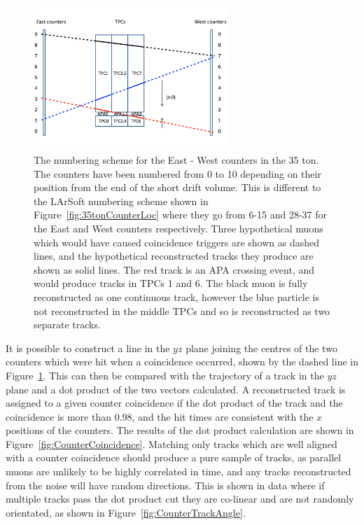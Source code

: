 \begin{figure}[h!]
  \centering
  \includegraphics[width=0.65\textwidth]{CounterSchematic}
  \caption[The numbering scheme for the East - West counters in the 35 ton]
          {The numbering scheme for the East - West counters in the 35 ton. The counters have been numbered from 0 to 10 depending on their position from the end of the short drift volume. This is different to the LArSoft numbering scheme shown in Figure~\ref{fig:35tonCounterLoc} where they go from 6-15 and 28-37 for the East and West counters respectively. Three hypothetical muons which would have caused coincidence triggers are shown as dashed lines, and the hypothetical reconstructed tracks they produce are shown as solid lines. The red track is an APA crossing event, and would produce tracks in TPCs 1 and 6. The black muon is fully reconstructed as one continuous track, however the blue particle is not reconstructed in the middle TPCs and so is reconstructed as two separate tracks.}
  \label{fig:EWCounters}
\end{figure}

It is possible to construct a line in the $yz$ plane joining the centres of the two counters which were hit when a coincidence occurred, shown by the dashed line in Figure~\ref{fig:EWCounters}. This can then be compared with the trajectory of a track in the $yz$ plane and a dot product of the two vectors calculated. A reconstructed track is assigned to a given counter coincidence if the dot product of the track and the coincidence is more than 0.98, and the hit times are consistent with the $x$ positions of the counters. The results of the dot product calculation are shown in Figure~\ref{fig:CounterCoincidence}. Matching only tracks which are well aligned with a counter coincidence should produce a pure sample of tracks, as parallel muons are unlikely to be highly correlated in time, and any tracks reconstructed from the noise will have random directions. This is shown in data where if multiple tracks pass the dot product cut they are co-linear and are not randomly orientated, as shown in Figure~\ref{fig:CounterTrackAngle}. \\

